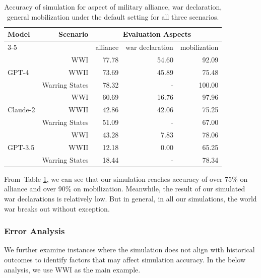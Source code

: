 \documentclass{article}
\begin{document}
\begin{table}[!ht]
    \centering
    \begin{tabular}{lrrrr}
        \toprule
        \multirow{2}{*}{\bf Model} & \multirow{2}{*}{\bf Scenario} & \multicolumn{3}{c}{\bf Evaluation Aspects} \\
        \cmidrule(lr){3-5}
        & & alliance  & war declaration  & mobilization  \\
        \midrule
        \multirow{3}{*}{GPT-4} & WWI & 77.78 & 54.60  & 92.09 \\
        & WWII & 73.69 & 45.89 & 75.48 \\
        & Warring States & 78.32 & - & 100.00\\
        \midrule
        \multirow{3}{*}{Claude-2} & WWI & 60.69  & 16.76  & 97.96\\
        & WWII & 42.86 & 42.06 & 75.25 \\
        & Warring States & 51.09 & - & 67.00\\
        \midrule
        \multirow{3}{*}{GPT-3.5} & WWI & 43.28 & 7.83 & 78.06 \\
        & WWII & 12.18 & 0.00 & 65.25 \\
        & Warring States  & 18.44 & - & 78.34\\
        \bottomrule
    \end{tabular}
    \caption{Accuracy of simulation for aspect of military alliance, war declaration, general mobilization under the default setting for all three scenarios.}
    \label{tab:aspect_acc}
\end{table}

From~Table \ref{tab:aspect_acc}, we can see that our simulation reaches accuracy of over 75\% on alliance and over 90\% on mobilization. Meanwhile, the result of our simulated war declarations is relatively low. But in general, in all our simulations, the world war breaks out without exception.


\subsubsection{Error Analysis}
We further examine instances where the simulation does not align with historical outcomes to identify factors that may affect simulation accuracy. In the below analysis, we use WWI as the main example.
\end{document}
